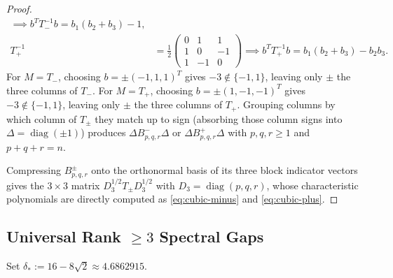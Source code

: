 \documentclass[11pt,reqno]{article}
\theoremstyle{definition}
\newcommand{\diag}{\operatorname{diag}}
\begin{document}
\begin{proof}
\begin{align*}
\implies b^T T_-^{-1} b = b_1(b_2 + b_3) - 1, \\
T_+^{-1} &= \frac{1}{2}\begin{pmatrix} 0 & 1 & 1 \\ 1 & 0 & -1 \\ 1 & -1 & 0 \end{pmatrix}
\implies b^T T_+^{-1} b = b_1(b_2 + b_3) - b_2 b_3.
\end{align*}
For $M = T_-$, choosing $b = \pm(-1, 1, 1)^T$ gives $-3 \notin \{-1, 1\}$, leaving only $\pm$ the three columns of $T_-$. For $M = T_+$, choosing $b = \pm(1, -1, -1)^T$ gives $-3 \notin \{-1, 1\}$, leaving only $\pm$ the three columns of $T_+$. Grouping columns by which column of $T_\pm$ they match up to sign (absorbing those column signs into $\Delta = \diag(\pm 1)$) produces $\Delta B^-_{p,q,r} \Delta$ or $\Delta B^+_{p,q,r} \Delta$ with $p, q, r \ge 1$ and $p + q + r = n$.

Compressing $B^\pm_{p,q,r}$ onto the orthonormal basis of its three block indicator vectors gives the $3 \times 3$ matrix $D_3^{1/2} T_\pm D_3^{1/2}$ with $D_3 = \diag(p, q, r)$, whose characteristic polynomials are directly computed as \eqref{eq:cubic-minus} and \eqref{eq:cubic-plus}.
\end{proof}

\subsection{Universal Rank \texorpdfstring{$\ge 3$}{>= 3} Spectral Gaps}

Set $\delta_* := 16 - 8\sqrt{2} \approx 4.6862915$.
\end{document}
